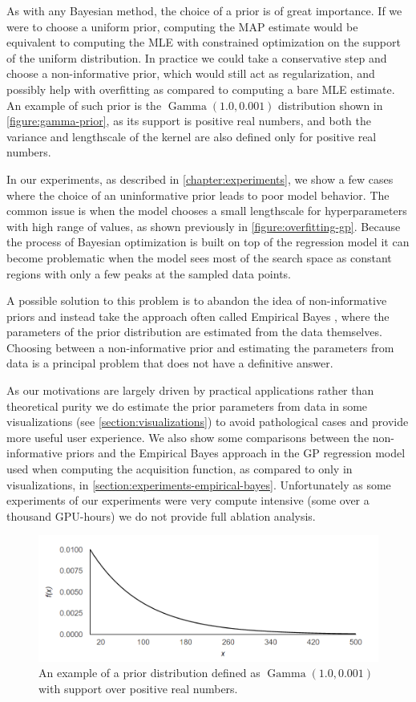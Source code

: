 As with any Bayesian method, the choice of a prior is of great importance. If we were to choose a uniform prior, computing the MAP estimate would be equivalent to computing the MLE with constrained optimization on the support of the uniform distribution. In practice we could take a conservative step and choose a non-informative prior, which would still act as regularization, and possibly help with overfitting as compared to computing a bare MLE estimate. An example of such prior is the $\operatorname{Gamma}(1.0, 0.001)$ distribution shown in \autoref{figure:gamma-prior}, as its support is positive real numbers, and both the variance and lengthscale of the kernel are also defined only for positive real numbers.

In our experiments, as described in \autoref{chapter:experiments}, we show a few cases where the choice of an uninformative prior leads to poor model behavior. The common issue is when the model chooses a small lengthscale for hyperparameters with high range of values, as shown previously in \autoref{figure:overfitting-gp}. Because the process of Bayesian optimization is built on top of the regression model it can become problematic when the model sees most of the search space as constant regions with only a few peaks at the sampled data points.

A possible solution to this problem is to abandon the idea of non-informative priors and instead take the approach often called Empirical Bayes \citep{murphy2012machine}, where the parameters of the prior distribution are estimated from the data themselves. Choosing between a non-informative prior and estimating the parameters from data is a principal problem that does not have a definitive answer.

As our motivations are largely driven by practical applications rather than theoretical purity we do estimate the prior parameters from data in some visualizations (see \autoref{section:visualizations}) to avoid pathological cases and provide more useful user experience. We also show some comparisons between the non-informative priors and the Empirical Bayes approach in the GP regression model used when computing the acquisition function, as compared to only in visualizations, in \autoref{section:experiments-empirical-bayes}. Unfortunately as some experiments of our experiments were very compute intensive (some over a thousand GPU-hours) we do not provide full ablation analysis.

\begin{figure}
	\begin{center}
		\includegraphics[width=1.0\textwidth]{images/gamma-prior.png}
		\caption{An example of a prior distribution defined as $\operatorname{Gamma}(1.0, 0.001)$ with support over positive real numbers.}
		\label{figure:gamma-prior}
	\end{center}
\end{figure}

